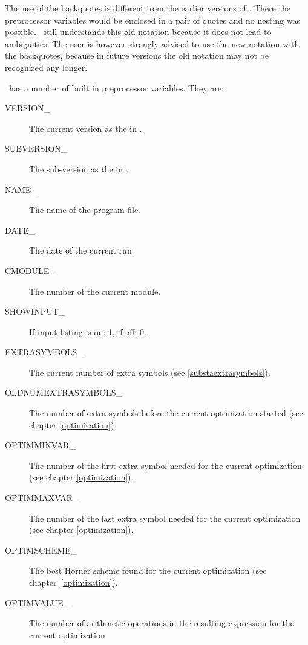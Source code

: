 The use of the backquotes is different from the earlier versions of \FORM. 
There the preprocessor variables would be enclosed in a pair of quotes and 
no nesting was possible. \FORM\ still understands this old 
notation because it does not lead to ambiguities. The user is however 
strongly advised to use the new notation with the backquotes, because in 
future versions the old notation may not be recognized 
any longer.

\noindent \FORM\ has a number of built in preprocessor variables. They are:

\begin{description}
\item[VERSION\_]  The current version as the \formmajorversion{} in 
                \formmajorversion.\formminorversion.
\item[SUBVERSION\_]  The sub-version as the \formminorversion{} in 
                \formmajorversion.\formminorversion.
\item[NAME\_]        The name of the program file.
\item[DATE\_]        The date of the current run.
\item[CMODULE\_]     The number of the current module.
\item[SHOWINPUT\_]   If input listing is on: 1, if off: 0.
\item[EXTRASYMBOLS\_]  The current number of extra symbols
       (see \ref{substaextrasymbols}).
\item[OLDNUMEXTRASYMBOLS\_]  The number of extra symbols
            before the current optimization started (see chapter \ref{optimization}).
\item[OPTIMMINVAR\_]  The number of the first extra symbol needed
               for the current optimization (see chapter \ref{optimization}).
\item[OPTIMMAXVAR\_]  The number of the last extra symbol needed
               for the current optimization (see chapter \ref{optimization}).
\item[OPTIMSCHEME\_]  The best Horner scheme found 
               for the current optimization (see chapter~\ref{optimization}).
\item[OPTIMVALUE\_]  The number of arithmetic operations 
               in the resulting expression for the current optimization 

\end{description}
